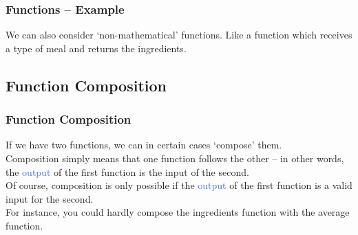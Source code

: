 \documentclass[aspectratio=169,11pt,dvipsnames]{beamer}
\newcommand{\clr}{\textcolor{BrickRed}}
\newcommand{\clb}{\textcolor{RoyalBlue}}
\begin{document}
\begin{frame}
 \frametitle{Functions -- Example}
 We can also consider `non-mathematical' functions. Like a function which
 receives a type of meal and returns the ingredients.\\ \pause
 \begin{center}
 \end{center}
\end{frame}

\subsection{Function Composition}

\begin{frame}
 \subsectionpage
\end{frame}

\begin{frame}
 \frametitle{Function Composition}
 If we have \alert{two functions}, we can \alert{in certain cases} `compose'
 them. \\ \pause
 \alert{Composition} simply means that \alert{one function follows the other} --
 in other words, the \clb{output} of the first function is the \clr{input} of
 the second.\\ \pause
 Of course, \alert{composition} is only possible if the \clb{output} of the
 first function is a valid \clr{input} for the second. \\ \pause
 For instance, you could hardly compose the \alert{ingredients} function with
 the \alert{average} function.
\end{frame}
\end{document}
